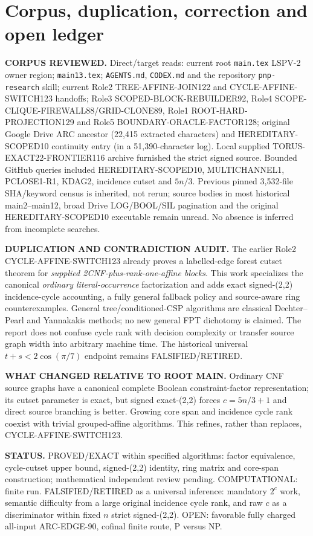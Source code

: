 \documentclass[11pt]{article}
\begin{document}
\section{Corpus, duplication, correction and open ledger}
\textbf{CORPUS REVIEWED.} Direct/target reads: current root \texttt{main.tex} LSPV-2 owner region; \texttt{main13.tex}; \texttt{AGENTS.md}, \texttt{CODEX.md} and the repository \texttt{pnp-research} skill; current Role2 TREE-AFFINE-JOIN122 and CYCLE-AFFINE-SWITCH123 handoffs; Role3 SCOPED-BLOCK-REBUILDER92, Role4 SCOPE-CLIQUE-FIREWALL88/GRID-CLONE89, Role1 ROOT-HARD-PROJECTION129 and Role5 BOUNDARY-ORACLE-FACTOR128; original Google Drive ARC ancestor (22,415 extracted characters) and HEREDITARY-SCOPED10 continuity entry (in a 51,390-character log). Local supplied TORUS-EXACT22-FRONTIER116 archive furnished the strict signed source. Bounded GitHub queries included HEREDITARY-SCOPED10, MULTICHANNEL1, PCLOSE1-R1, KDAG2, incidence cutset and $5n/3$. Previous pinned 3,532-file SHA/keyword census is inherited, not rerun; source bodies in most historical main2--main12, broad Drive LOG/BOOL/SIL pagination and the original HEREDITARY-SCOPED10 executable remain unread. No absence is inferred from incomplete searches.

\textbf{DUPLICATION AND CONTRADICTION AUDIT.} The earlier Role2 CYCLE-AFFINE-SWITCH123 already proves a labelled-edge forest cutset theorem for \emph{supplied 2CNF-plus-rank-one-affine blocks}. This work specializes the canonical \emph{ordinary literal-occurrence} factorization and adds exact signed-(2,2) incidence-cycle accounting, a fully general fallback policy and source-aware ring counterexamples. General tree/conditioned-CSP algorithms are classical Dechter--Pearl and Yannakakis methods; no new general FPT dichotomy is claimed. The report does not confuse cycle rank with decision complexity or transfer source graph width into arbitrary machine time. The historical universal $t+s<2\cos(\pi/7)$ endpoint remains FALSIFIED/RETIRED.

\textbf{WHAT CHANGED RELATIVE TO ROOT MAIN.} Ordinary CNF source graphs have a canonical complete Boolean constraint-factor representation; its cutset parameter is exact, but signed exact-(2,2) forces $c=5n/3+1$ and direct source branching is better. Growing core span and incidence cycle rank coexist with trivial grouped-affine algorithms. This refines, rather than replaces, CYCLE-AFFINE-SWITCH123.

\textbf{STATUS.} PROVED/EXACT within specified algorithms: factor equivalence, cycle-cutset upper bound, signed-(2,2) identity, ring matrix and core-span construction; mathematical independent review pending. COMPUTATIONAL: finite run. FALSIFIED/RETIRED as a universal inference: mandatory $2^c$ work, semantic difficulty from a large original incidence cycle rank, and raw $c$ as a discriminator within fixed $n$ strict signed-(2,2). OPEN: favorable fully charged all-input ARC-EDGE-90, cofinal finite route, P versus NP.
\end{document}
